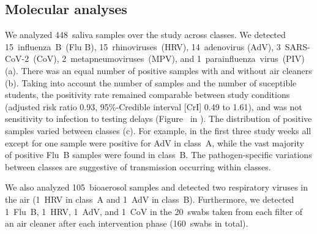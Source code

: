 \documentclass[fleqn,11pt]{wlscirep}
\begin{document}
\subsection{Molecular analyses}

We analyzed 448~saliva samples over the study across classes. We detected 15~influenza~B~(Flu B), 15~rhinoviruses~(HRV), 14~adenovirus (AdV), 3~SARS-CoV-2~(CoV), 2~metapneumoviruses~(MPV), and 1~parainfluenza~virus~(PIV) (a). There was an equal number of positive samples with and without air cleaners (b). Taking into account the number of samples and the number of suceptible students, the positivity rate remained comparable between study conditions (adjusted risk ratio 0.93, 95\%-Credible interval [CrI] 0.49 to 1.61), and was not sensitivity to infection to testing delays (Figure~ in \supp). The distribution of positive samples varied between classes (c). For example, in the first three study weeks all except for one sample were positive for AdV in class~A, while the vast majority of positive Flu~B samples were found in class~B. The pathogen-specific variations between classes are suggestive of transmission occurring within classes.

We also analyzed 105~bioaerosol samples and detected  two respiratory viruses in the air (1~HRV in class~A and 1~AdV in class~B). Furthermore, we detected 1~Flu~B, 1~HRV, 1~AdV, and 1~CoV in the 20~swabs taken from each filter of an air cleaner after each intervention phase (160~swabs in total).
\end{document}
